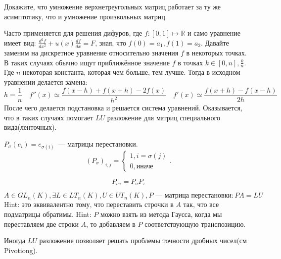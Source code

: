 \begin{task}
    Докажите, что умножение верхнетреугольных матриц работает за ту же асимптотику, что и умножение произвольных матриц.
\end{task}
\begin{example}
    Часто применяется для решения дифуров, где $f\colon [0, 1]\mapsto \mathbb{R}$ и само уравнение имеет вид:
    $\frac{d^2f}{dx^2} + u(x)\frac{df}{dx} = F$, зная, что $f(0) = a_1, f(1) = a_2$.
    Давайте заменим на дискретное уравнение относительно значения $f$ в некоторых точках. 
    В таких случаях обычно ищут приближённое значение $f$ в точках
    $k\in[0,n], \frac{k}{n}$. Где $n$ некоторая константа, которая чем больше, тем лучше.
    Тогда в исходном уравнении делается замена:
    \[
        h = \frac{1}{n}\quad
        f''(x)\simeq \frac{f(x-h)+f(x+h)-2f(x)}{h^2}\quad
        f'(x)\simeq \frac{f(x+h) - f(x - h)}{2h}
    \] 
    После чего делается подстановка и решается система уравнений.
    Оказывается, что в таких случаях помогает $LU$ разложение для матриц специального вида(ленточных).
\end{example}
\begin{example}
    $P_\sigma(e_i)= e_{\sigma(i)}$~--- матрицы перестановки.
     \[
         (P_\sigma)_{i,j} = \begin{cases}
             1, i = \sigma(j)\\
             0, \text{иначе}
         \end{cases}
    .\]
\end{example}
\begin{task}
    \[
        P_{\sigma\tau} = P_{\sigma} P_{\tau}
    \] 
\end{task}
\begin{task}
   \[
       A\in GL_n(K), \exists L\in LT_n(K), U\in UT_n(K), P\text{~--- матрица перестановки}\colon PA = LU
   \]  
   Hint: это эквивалентно тому, что переставить строчки в $A$ так, что все подматрицы обратимы.
   Hint: $P$ можно взять из метода Гаусса, когда мы переставляем две строки $A$, то добавляем в $P$ 
   соответствующую транспозицию.
\end{task}
\begin{remark}
    Иногда $LU$ разложение позволяет решать проблемы точности дробных чисел(см Pivotiong).
\end{remark}
